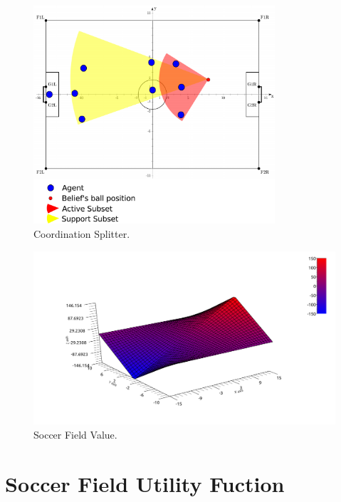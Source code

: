 \begin{figure}[t!]
\centering
  \includegraphics[width=0.8\textwidth]{Chapter4/figures/Splitter.pdf}
  \caption{Coordination Splitter.} 
  \label{fig:Splitter}
\end{figure}



\begin{figure}[t!]
\centering
  \includegraphics[width=\textwidth]{Chapter4/figures/Graph1.pdf}
  \caption{Soccer Field Value.} 
  \label{fig:SoccerValue}
\end{figure}



\section{Soccer Field Utility Fuction}
\label{FieldValue}

